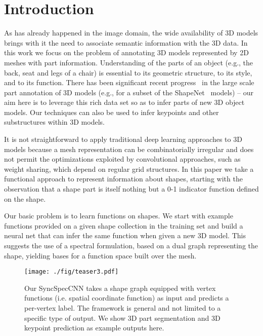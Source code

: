 \documentclass[10pt,twocolumn,letterpaper]{article}
\begin{document}
\section{Introduction}
\label{sec:intro}
As has already happened in the image domain, the wide availability of 3D models brings with it the need to associate semantic information with the 3D data. In this work we focus on the problem of annotating 3D models represented by 2D meshes with part information. Understanding of the parts of an object (e.g., the back, seat and legs of a chair) is essential to its geometric structure, to its style, and to its function. There has been significant recent progress~\cite{Yi16} in the large scale part annotation of 3D models (e.g., for a subset of the ShapeNet~\cite{shapenet2015} models) -- our aim here is to leverage this rich data set so as to infer parts of new 3D object models. Our techniques can also be used to infer keypoints and other substructures within 3D models.

It is not straightforward to apply traditional deep learning approaches to 3D models because a mesh representation can be combinatorially irregular and does not permit the optimizations exploited by convolutional approaches, such as weight sharing, which depend on regular grid structures. In this paper we take a functional approach to represent information about shapes, starting with the observation that a shape part is itself nothing but a 0-1 indicator function defined on the shape. 

Our basic problem is to learn functions on shapes. We start with example functions provided on a given shape collection in the training set and build a neural net that can infer the same function when given a new 3D model. This suggests the use of a spectral formulation, based on a dual graph representing the shape, yielding bases for a function space built over the mesh.  

\begin{figure}
    \centering
    \texttt{[image: ./fig/teaser3.pdf]}
    \caption{Our SyncSpecCNN takes a shape graph equipped with vertex functions (i.e. spatial coordinate function) as input and predicts a per-vertex label. The framework is general and not limited to a specific type of output. We show 3D part segmentation and 3D keypoint prediction as example outputs here. }
    \label{fig:teaser}
    \vspace{-0.3cm}

\end{figure}
\end{document}
